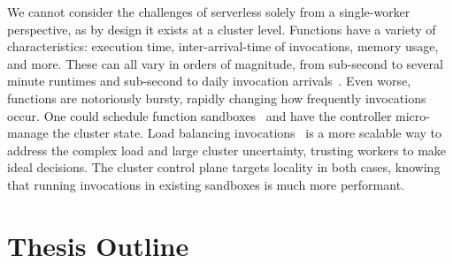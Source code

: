 We cannot consider the challenges of serverless solely from a single-worker perspective, as by design it exists at a cluster level.
Functions have a variety of characteristics: execution time, inter-arrival-time of invocations, memory usage, and more.
These can all vary in orders of magnitude, from sub-second to several minute runtimes and sub-second to daily invocation arrivals~\cite{shahrad2020serverless}.
Even worse, functions are notoriously bursty, rapidly changing how frequently invocations occur.
One could schedule function sandboxes~\cite{balaji2021fireplace,kaffes2021practical,abdi2023palette,openwhisk} and have the controller micro-manage the cluster state.
Load balancing invocations~\cite{aumala2019beyond,leegreedy,faaslb-hpdc22} is a more scalable way to address the complex load and large cluster uncertainty, trusting workers to make ideal decisions.
The cluster control plane targets locality in both cases, knowing that running invocations in existing sandboxes is much more performant.






\section{Thesis Outline}


